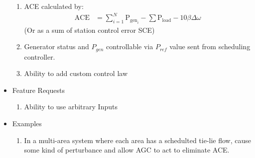 \documentclass[12pt]{article}
\newcommand{\pgen}[1]{\ensuremath{\text{P}_{\text{gen}_{#1}}}}
\newcommand{\pload}{\ensuremath{\text{P}_{\text{load}}}}
\begin{document}
\begin{multicols*}{2}
\begin{itemize}
	\begin{enumerate}
		\item ACE calculated by:
\begin{align*}
\text{ACE} &= \sum_{i=1}^{N}\pgen{i} - \sum \pload -10 \beta \Delta\omega
\end{align*}
(Or as a sum of station control error SCE)
		\item  Generator status and $P_{gen}$ controllable via $P_{ref}$ value sent from scheduling controller.
		\item Ability to add custom control law
	\end{enumerate}
	\item Feature Requests
	\begin{enumerate}
		\item Ability to use arbitrary Inputs
	\end{enumerate}
	\item Examples
	\begin{enumerate}
	\item In a multi-area system where each area has a schedulted tie-lie flow, cause some kind of perturbance and allow AGC to act to eliminate ACE.
	\end{enumerate}	
\end{itemize}
\vfill\null
\end{multicols*}
\end{document}
